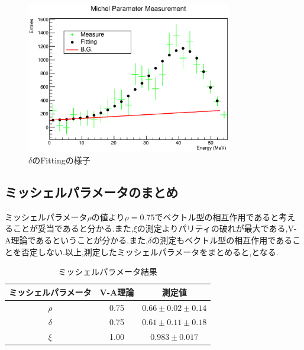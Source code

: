 \begin{figure}[bht]
  \centering
  \includegraphics[width=0.8\textwidth]{figure/hatano/delta.eps}
  \caption{$\delta$のFittingの様子}
  \label{hatano_fig:delta}
\end{figure}

\subsection{ミッシェルパラメータのまとめ}
ミッシェルパラメータ$\rho$の値より$\rho=0.75$でベクトル型の相互作用であると考えることが妥当であると分かる.また,$\xi$の測定よりパリティの破れが最大である,V-A理論であるということが分かる.また,$\delta$の測定もベクトル型の相互作用であることを否定しない.以上,測定したミッシェルパラメータをまとめると,となる.

\begin{table}[bht]
  \centering
  \caption{ミッシェルパラメータ結果}
  \begin{tabular}{ccc}
    \hline
    ミッシェルパラメータ & V-A理論 & 測定値 \\ \hline
    $\rho$   & 0.75 & $0.66\pm0.02\pm0.14$ \\
    $\delta$ & 0.75 & $0.61\pm0.11\pm0.18$ \\
    $\xi$    & 1.00 & $0.983\pm0.017$\\
    \hline
  \end{tabular}
  \label{hatano_tab:michel}
\end{table}


%

